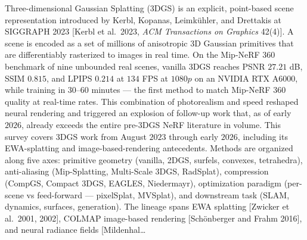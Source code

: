 Three-dimensional Gaussian Splatting (3DGS) is an explicit, point-based scene representation introduced by Kerbl, Kopanas, Leimkühler, and Drettakis at SIGGRAPH 2023 {[}Kerbl et al.~2023, \emph{ACM Transactions on Graphics} 42(4){]}. A scene is encoded as a set of millions of anisotropic 3D Gaussian primitives that are differentiably rasterized to images in real time. On the Mip-NeRF 360 benchmark of nine unbounded real scenes, vanilla 3DGS reaches PSNR \(27.21\) dB, SSIM \(0.815\), and LPIPS \(0.214\) at \(134\) FPS at \(1080p\) on an NVIDIA RTX A6000, while training in \(30\)--\(60\) minutes --- the first method to match Mip-NeRF 360 quality at real-time rates. This combination of photorealism and speed reshaped neural rendering and triggered an explosion of follow-up work that, as of early \(2026\), already exceeds the entire pre-3DGS NeRF literature in volume. This survey covers 3DGS work from August \(2023\) through early \(2026\), including its EWA-splatting and image-based-rendering antecedents. Methods are organized along five axes: primitive geometry (vanilla, 2DGS, surfels, convexes, tetrahedra), anti-aliasing (Mip-Splatting, Multi-Scale 3DGS, RadSplat), compression (CompGS, Compact 3DGS, EAGLES, Niedermayr), optimization paradigm (per-scene vs feed-forward --- pixelSplat, MVSplat), and downstream task (SLAM, dynamics, surfaces, generation). The lineage spans EWA splatting {[}Zwicker et al.~2001, 2002{]}, COLMAP image-based rendering {[}Schönberger and Frahm 2016{]}, and neural radiance fields {[}Mildenhal\ldots{}
